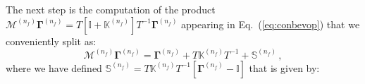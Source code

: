 \documentclass[10pt,a4paper]{article}
\begin{document}
The next step is the computation of the product
$\mathcal{M}^{(n_f)}{\bm\Gamma}^{(n_f)}=T\left[\mathbb{I}+\mathbb{K}^{(n_f)}\right]T^{-1}{\bm\Gamma}^{(n_f)}$
appearing in Eq.~(\ref{eq:conbevop}) that we conveniently split as:
\begin{equation}\label{eq:nthfactor}
\mathcal{M}^{(n_f)}{\bm\Gamma}^{(n_f)}={\bm \Gamma}^{(n_f)}+ T\mathbb{K}^{(n_f)}T^{-1}+\mathbb{S}^{(n_f)}\,,
\end{equation}
where we have defined
$\mathbb{S}^{(n_f)}=T\mathbb{K}^{(n_f)}
T^{-1}\left[{\bm\Gamma}^{(n_f)}-\mathbb{I}\right]$ that is given by:
\end{document}
